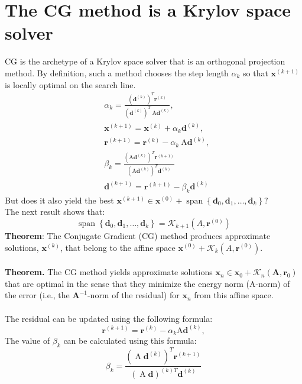 \documentclass[11pt]{book}
\begin{document}
\section*{The CG method is a Krylov space solver}
CG is the archetype of a Krylov space solver that is an orthogonal projection method. By definition, such a method chooses the step length $\alpha_{k}$ so that $\mathbf{x}^{(k+1)}$ is locally optimal on the search line.
$$
\begin{aligned}
& \alpha_{k}=\frac{\left(\mathbf{d}^{(k)}\right)^{T} \mathbf{r}^{(k)}}{\left(\mathbf{d}^{(k)}\right)^{T} \mathrm{~A} \mathbf{d}^{(k)}}, \\
& \mathbf{x}^{(k+1)}=\mathbf{x}^{(k)}+\alpha_{k} \mathbf{d}^{(k)}, \\
& \mathbf{r}^{(k+1)}=\mathbf{r}^{(k)}-\alpha_{k} \mathrm{~A} \mathbf{d}^{(k)}, \\
& \beta_{k}=\frac{\left(\mathrm{A} \mathbf{d}^{(k)}\right)^{T} \mathbf{r}^{(k+1)}}{\left(\mathrm{A}\mathbf{d}^{(k)}\right)^{T} \mathbf{d}^{(k)}} \\
& \mathbf{d}^{(k+1)}=\mathbf{r}^{(k+1)}-\beta_{k} \mathbf{d}^{(k)}
\end{aligned}
$$
But does it also yield the best $
\mathbf{x}^{(k+1)} \in \mathbf{x}^{(0)}+\operatorname{span}\left\{\mathbf{d}_{0}, \mathbf{d}_{1}, \ldots, \mathbf{d}_{k}\right\} ?
$\\ 
The next result shows that:
$$
\operatorname{span}\left\{\mathbf{d}_{0}, \mathbf{d}_{1}, \ldots, \mathbf{d}_{k}\right\}=\mathscr{K}_{k+1}\left(A, \mathbf{r}^{(0)}\right)
$$
\textbf{Theorem}: The Conjugate Gradient (CG) method produces approximate solutions, $\mathbf{x}^{(k)}$, that belong to the affine space $\mathbf{x}^{(0)}+\mathscr{K}_{k}\left(A, \mathbf{r}^{(0)}\right)$.\\ \\
\textbf{Theorem.} The CG method yields approximate solutions $\mathbf{x}_n \in \mathbf{x}_0+\mathcal{K}_n\left(\mathbf{A}, \mathbf{r}_0\right)$ that are optimal in the sense that they minimize the energy norm (A-norm) of the error (i.e., the $\mathbf{A}^{-1}$-norm of the residual) for $\mathbf{x}_n$ from this affine space.\\ \\ 
The residual can be updated using the following formula:
$$
\mathbf{r}^{(k+1)}=\mathbf{r}^{(k)}-\alpha_{k} \mathrm{A}\mathbf{d}^{(k)},
$$
The value of $\beta_{k}$ can be calculated using this formula:
$$
\beta_{k}=\frac{\left(\operatorname{A}\mathbf{d}^{(k)}\right)^{T} \mathbf{r}^{(k+1)}}{\left(\operatorname{A}\mathbf{d}\right)^{(k)T} \mathbf{d}^{(k)}}
$$
\end{document}

